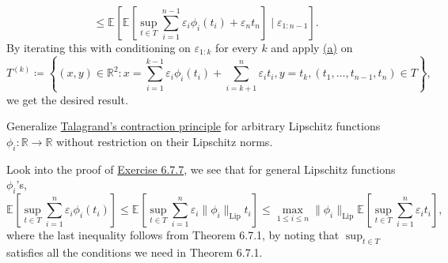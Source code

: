 \begin{answer}
\begin{enumerate}[(a)]
\[			      \leq \mathbb{E}_{}\left[ \mathbb{E}_{}\left[\sup _{t \in T} \sum_{i=1}^{n-1} \varepsilon _i \phi _i(t_i) + \varepsilon _n t_n\right] \mid \varepsilon _{1\colon n-1} \right].
		      \]
		      By iterating this with conditioning on \(\varepsilon _{1 \colon k}\) for every \(k\) and apply \hyperref[ex6.7.7:a]{(a)} on
		      \[
			      T^{(k)}
			      \coloneqq \left\{ (x, y) \in \mathbb{R} ^2 \colon x = \sum_{i=1}^{k-1} \varepsilon _i \phi _i(t_i) + \sum_{i=k+1}^{n} \varepsilon _i t_i, y = t_k, (t _1, \dots , t_{n-1}, t_n) \in T \right\},
		      \]
		      we get the desired result.
	\end{enumerate}
\end{answer}

\begin{problem*}[Exercise 6.7.8]\label{ex6.7.8}
	Generalize \hyperref[ex6.7.7]{Talagrand's contraction principle} for arbitrary Lipschitz functions \(\phi _i \colon \mathbb{R} \to \mathbb{R} \) without restriction on their Lipschitz norms.
\end{problem*}
\begin{answer}
	Look into the proof of \hyperref[ex6.7.7]{Exercise 6.7.7}, we see that for general Lipschitz functions \(\phi _i\)'s,
	\[
		\mathbb{E}_{}\left[\sup _{t \in T} \sum_{i=1}^{n} \varepsilon _i \phi _i(t_i) \right]
		\leq \mathbb{E}_{}\left[\sup _{t \in T} \sum_{i=1}^{n} \varepsilon _i \lVert \phi _i \rVert _{\mathrm{Lip} } t_i \right]
		\leq \max _{1 \leq i \leq n} \lVert \phi _i \rVert _{\mathrm{Lip} } \mathbb{E}_{}\left[\sup _{t \in T} \sum_{i=1}^{n} \varepsilon _i t_i \right],
	\]
	where the last inequality follows from Theorem 6.7.1, by noting that \(\sup _{t \in T} \) satisfies all the conditions we need in Theorem 6.7.1.
\end{answer}